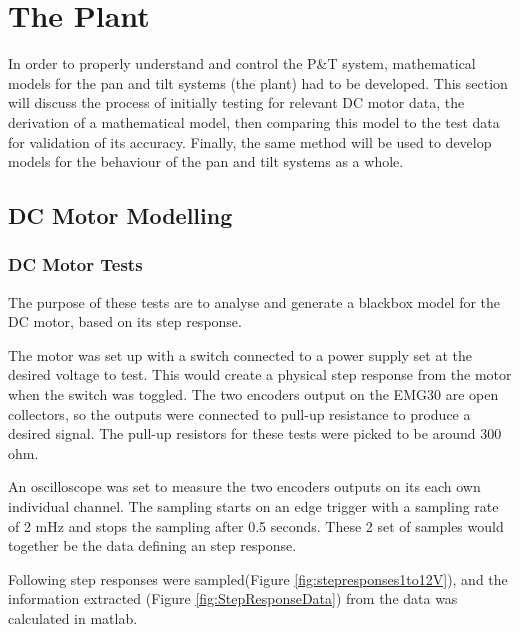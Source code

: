 \section{The Plant}
In order to properly understand and control the P\&T system, mathematical models for the pan and tilt systems (the plant) had to be developed. This section will discuss the process of initially testing for relevant DC motor data, the derivation of a mathematical model, then comparing this  model to the test data for validation of its accuracy. Finally, the same method will be used to develop models for the behaviour of the pan and tilt systems as a whole.

\subsection{DC Motor Modelling}
\subsubsection{DC Motor Tests}
The purpose of these tests are to analyse and generate a blackbox model for the DC motor, based on its step response. 

The motor was set up with a switch connected to a power supply set at the desired voltage to test. This would create a physical step response from the motor when the switch was toggled. The two encoders output on the EMG30 are open collectors, so the outputs were connected to pull-up resistance to produce a desired signal. The pull-up resistors for these tests were picked to be around 300 ohm.

An oscilloscope was set to measure the two encoders outputs on its each own individual channel. The sampling starts on an edge trigger with a sampling rate of 2 mHz and stops the sampling after 0.5 seconds.
These 2 set of samples would together be the data defining an step response.

Following step responses were sampled(Figure \ref{fig:stepresponses1to12V}), and the information extracted (Figure \ref{fig:StepResponseData}) from the data was calculated in matlab. 

